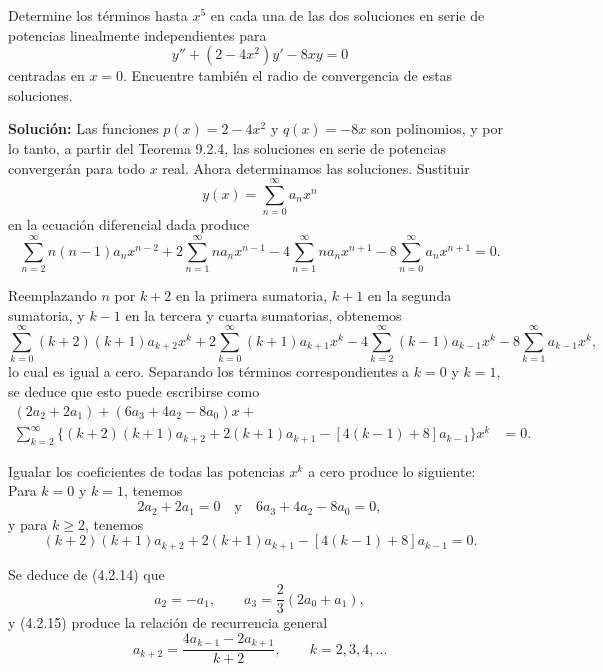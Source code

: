 \begin{example}
    Determine los términos hasta $x^5$ en cada una de las dos soluciones en serie de potencias linealmente independientes para
\[ y'' + (2 - 4x^2)y' - 8xy = 0 \]
centradas en $x = 0$. Encuentre también el radio de convergencia de estas soluciones.

\noindent \textbf{Solución:} \quad Las funciones $p(x) = 2 - 4x^2$ y $q(x) = -8x$ son polinomios, y por lo tanto, a partir del Teorema 9.2.4, las soluciones en serie de potencias convergerán para todo $x$ real. Ahora determinamos las soluciones. Sustituir
\begin{equation} \tag{4.2.13}
y(x) = \sum_{n=0}^{\infty} a_n x^n
\end{equation}
en la ecuación diferencial dada produce
\[ \sum_{n=2}^{\infty} n(n-1)a_n x^{n-2} + 2\sum_{n=1}^{\infty} n a_n x^{n-1} - 4\sum_{n=1}^{\infty} n a_n x^{n+1} - 8\sum_{n=0}^{\infty} a_n x^{n+1} = 0. \]

Reemplazando $n$ por $k + 2$ en la primera sumatoria, $k + 1$ en la segunda sumatoria, y $k - 1$ en la tercera y cuarta sumatorias, obtenemos
\[ \sum_{k=0}^{\infty} (k+2)(k+1)a_{k+2}x^k + 2\sum_{k=0}^{\infty} (k+1)a_{k+1}x^k - 4\sum_{k=2}^{\infty} (k-1)a_{k-1}x^k - 8\sum_{k=1}^{\infty} a_{k-1}x^k, \]
lo cual es igual a cero. Separando los términos correspondientes a $k = 0$ y $k = 1$, se deduce que esto puede escribirse como
\begin{align*}
(2a_2 + 2a_1) + (6a_3 + 4a_2 - 8a_0)x + \quad & \\
\sum_{k=2}^{\infty} \{(k+2)(k+1)a_{k+2} + 2(k+1)a_{k+1} - [4(k-1) + 8]a_{k-1}\}x^k &= 0.
\end{align*}

Igualar los coeficientes de todas las potencias $x^k$ a cero produce lo siguiente: \\
Para $k = 0$ y $k = 1$, tenemos
\begin{equation} \tag{4.2.14}
2a_2 + 2a_1 = 0 \quad \text{y} \quad 6a_3 + 4a_2 - 8a_0 = 0,
\end{equation}
y para $k \ge 2$, tenemos
\begin{equation} \tag{4.2.15}
(k+2)(k+1)a_{k+2} + 2(k+1)a_{k+1} - [4(k-1) + 8]a_{k-1} = 0.
\end{equation}

Se deduce de (4.2.14) que
\begin{equation} \tag{4.2.16}
a_2 = -a_1, \qquad a_3 = \frac{2}{3}(2a_0 + a_1),
\end{equation}
y (4.2.15) produce la relación de recurrencia general
\begin{equation} \tag{4.2.17}
a_{k+2} = \frac{4a_{k-1} - 2a_{k+1}}{k+2}, \qquad k = 2, 3, 4, \dots
\end{equation}


\end{example}

